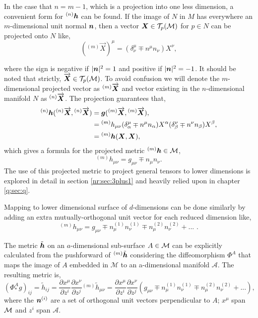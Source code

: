 In the case that $n=m-1$, which is a projection into one less dimension, a convenient form for ${}^{(n)}\boldsymbol{h}$ can be found. If the image of $N$ in $M$ has everywhere an $m$-dimensional unit normal $\boldsymbol{n}$, then a vector $\boldsymbol{X}\in \mathcal{T}_p(\mathcal{M})$ for $p\in N$ can be projected onto $N$ like,
\begin{equation}
({}^{(m)}\overrightarrow{{X}})^\mu = (\delta^\mu_\nu \mp n^\mu n_\nu )X^\nu,
\end{equation}

where the sign is negative if $|\boldsymbol{n}|^2=1$ and positive if $|\boldsymbol{n}|^2 = -1$. It should be noted that strictly, $\overrightarrow{\boldsymbol{X}} \in \mathcal{T}_p(\mathcal{M})$. To avoid confusion we will denote the $m$-dimensional projected vector as ${}^{(m)}\overrightarrow{\boldsymbol{X}}$ and vector existing in the $n$-dimensional manifold $N$ as ${}^{(n)}\overrightarrow{\boldsymbol{X}}$. The projection guarantees that,
\begin{align}
{}^{(n)}\boldsymbol{h} ({}^{(n)}\overrightarrow{\boldsymbol{X}},{}^{(n)}\overrightarrow{\boldsymbol{X}}  ) &= \boldsymbol{g} ({}^{(m)}\overrightarrow{\boldsymbol{X}},{}^{(m)}\overrightarrow{\boldsymbol{X}}  ),\\
&= {}^{(m)}{h}_{\mu\nu} (\delta^\mu_\alpha \mp n^\mu n_\alpha) {{X}}^\alpha(\delta^\nu_\beta \mp n^\nu n_\beta) {{X}}^\beta  ,\\
&= {}^{(m)}\boldsymbol{h} ({\boldsymbol{X}},{\boldsymbol{X}}  ),
\end{align}
which gives a formula for the projected metric ${}^{(m)}\boldsymbol{h} \in \mathcal{M}$,
\begin{equation}
{}^{(m)}h_{\mu\nu} = g_{\mu\nu} \mp n_\mu n_\nu.
\end{equation}
The use of this projected metric to project general tensors to lower dimensions is explored in detail in section \ref{nr:sec:3plus1} and heavily relied upon in chapter \ref{q:sec:q}.

Mapping to lower dimensional surface of $d$-dimensions can be done similarly by
adding an extra mutually-orthogonal unit vector for each reduced dimension like,
\begin{equation}
{}^{(m)}h_{\mu\nu} = g_{\mu\nu} \mp n^{(1)}_\mu n^{(1)}_\nu  \mp n^{(2)}_\mu n^{(2)}_\nu + ... \,\,.
\end{equation}

The metric $\tilde{\boldsymbol{h}}$ on an $a$-dimensional sub-surface $A\in\mathcal{M}$ can be explicitly calculated from the pushforward of ${}^{(m)}\tilde{\boldsymbol{h}}$ considering the diffeomorphism $\Phi^A$ that maps the image of $A$ embedded in $\mathcal{M}$ to an a-dimensional manifold $\mathcal{A}$. The resulting metric is,
\begin{equation}
(\Phi^A_* g)_{ij} = \tilde{h}_{ij} = \frac{\partial x^\mu}{\partial z^i} \frac{\partial x^\nu}{\partial z^j} {}^{(m)}\tilde{h}_{\mu\nu}  = \frac{\partial x^\mu}{\partial z^i} \frac{\partial x^\nu}{\partial z^j}\left( g_{\mu\nu}\mp n^{(1)}_\mu n^{(1)}_\nu  \mp n^{(2)}_\mu n^{(2)}_\nu + ...  \right), \label{intro:eq:projectedmetric}
\end{equation}
where the $\boldsymbol{n}^{(i)}$ are a set of orthogonal unit vectors perpendicular to $A$; $x^\mu$ span $\mathcal{M}$ and $z^i$ span $\mathcal{A}$.

